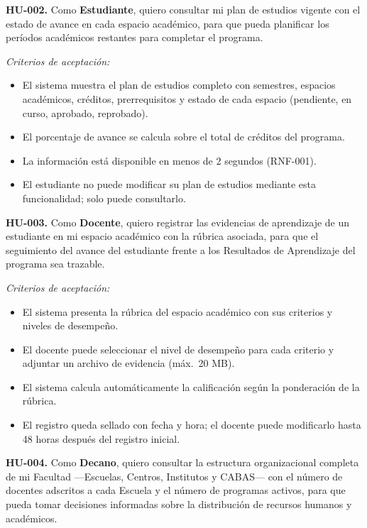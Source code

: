 \bigskip

\textbf{HU-002.} Como \textbf{Estudiante}, quiero consultar mi plan
de estudios vigente con el estado de avance en cada espacio académico,
para que pueda planificar los períodos académicos restantes para completar
el programa.

\textit{Criterios de aceptación:}
\begin{itemize}
  \item El sistema muestra el plan de estudios completo con semestres,
    espacios académicos, créditos, prerrequisitos y estado de cada espacio
    (pendiente, en curso, aprobado, reprobado).
  \item El porcentaje de avance se calcula sobre el total de créditos del
    programa.
  \item La información está disponible en menos de 2 segundos (RNF-001).
  \item El estudiante no puede modificar su plan de estudios mediante
    esta funcionalidad; solo puede consultarlo.
\end{itemize}

\bigskip

\textbf{HU-003.} Como \textbf{Docente}, quiero registrar las evidencias
de aprendizaje de un estudiante en mi espacio académico con la rúbrica
asociada, para que el seguimiento del avance del estudiante frente a los
Resultados de Aprendizaje del programa sea trazable.

\textit{Criterios de aceptación:}
\begin{itemize}
  \item El sistema presenta la rúbrica del espacio académico con sus criterios
    y niveles de desempeño.
  \item El docente puede seleccionar el nivel de desempeño para cada criterio
    y adjuntar un archivo de evidencia (máx.\ 20 MB).
  \item El sistema calcula automáticamente la calificación según la
    ponderación de la rúbrica.
  \item El registro queda sellado con fecha y hora; el docente puede modificarlo
    hasta 48 horas después del registro inicial.
\end{itemize}

\bigskip

\textbf{HU-004.} Como \textbf{Decano}, quiero consultar la estructura
organizacional completa de mi Facultad ---Escuelas, Centros, Institutos
y CABAS--- con el número de docentes adscritos a cada Escuela y el número
de programas activos, para que pueda tomar decisiones informadas sobre
la distribución de recursos humanos y académicos.


